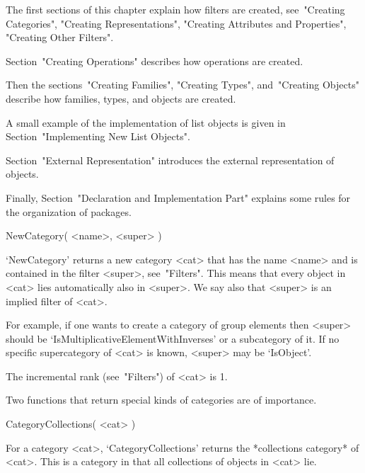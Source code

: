 

The first sections of this chapter explain how filters are created,
see~"Creating Categories", "Creating Representations",
"Creating Attributes and Properties", "Creating Other Filters".

Section~"Creating Operations" describes how operations are created.

Then the sections~"Creating Families", "Creating Types",
and~"Creating Objects" describe how families, types,
and objects are created.

A small example of the implementation of list objects is given
in Section~"Implementing New List Objects".

Section~"External Representation" introduces the external representation
of objects.

Finally, Section~"Declaration and Implementation Part" explains some
rules for the organization of {\GAP} packages.



\>NewCategory( <name>, <super> )

`NewCategory' returns a new category <cat> that has the name <name> and
is contained in the filter <super>, see~"Filters".
This means that every object in <cat> lies automatically also in <super>.
We say also that <super> is an implied filter of <cat>.

For example, if one wants to create a category of group elements
then <super> should be `IsMultiplicativeElementWithInverses' or a
subcategory of it.
If no specific supercategory of <cat> is known,
<super> may be `IsObject'.

The incremental rank (see~"Filters") of <cat> is 1.

Two functions that return special kinds of categories are of importance.

\>CategoryCollections( <cat> )

For a category <cat>,
`CategoryCollections' returns the *collections category* of <cat>.
This is a category in that all collections of objects in <cat> lie.

